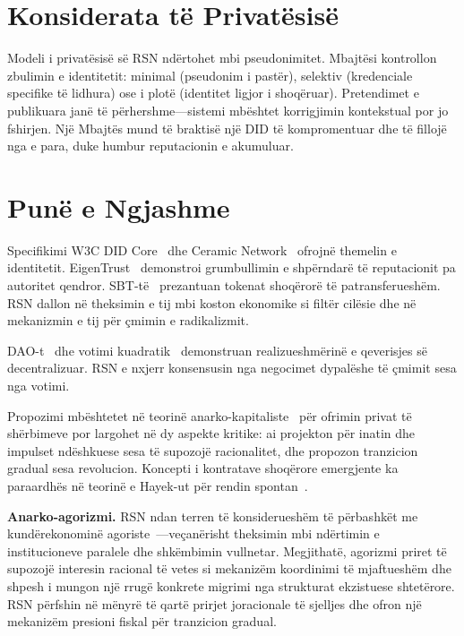 \documentclass[11pt,a4paper,twocolumn]{article}
\begin{document}
\section{Konsiderata të Privatësisë}

Modeli i privatësisë së RSN ndërtohet mbi pseudonimitet. Mbajtësi kontrollon zbulimin e identitetit: minimal (pseudonim i pastër), selektiv (kredenciale specifike të lidhura) ose i plotë (identitet ligjor i shoqëruar). Pretendimet e publikuara janë të përhershme---sistemi mbështet korrigjimin kontekstual por jo fshirjen. Një Mbajtës mund të braktisë një DID të kompromentuar dhe të fillojë nga e para, duke humbur reputacionin e akumuluar.

\section{Punë e Ngjashme}

Specifikimi W3C DID Core~\cite{did2022} dhe Ceramic Network~\cite{ceramic2023} ofrojnë themelin e identitetit. EigenTrust~\cite{kamvar2003} demonstroi grumbullimin e shpërndarë të reputacionit pa autoritet qendror. SBT-të~\cite{weyl2022} prezantuan tokenat shoqërorë të patransferueshëm. RSN dallon në theksimin e tij mbi koston ekonomike si filtër cilësie dhe në mekanizmin e tij për çmimin e radikalizmit.

DAO-t~\cite{buterin2014} dhe votimi kuadratik~\cite{buterin2019} demonstruan realizueshmërinë e qeverisjes së decentralizuar. RSN e nxjerr konsensusin nga negocimet dypalëshe të çmimit sesa nga votimi.

Propozimi mbështetet në teorinë anarko-kapitaliste~\cite{rothbard1973,hoppe2001} për ofrimin privat të shërbimeve por largohet në dy aspekte kritike: ai projekton për inatin dhe impulset ndëshkuese sesa të supozojë racionalitet, dhe propozon tranzicion gradual sesa revolucion. Koncepti i kontratave shoqërore emergjente ka paraardhës në teorinë e Hayek-ut për rendin spontan~\cite{hayek1973}.

\textbf{Anarko-agorizmi.} RSN ndan terren të konsiderueshëm të përbashkët me kundërekonominë agoriste~\cite{konkin2006}---veçanërisht theksimin mbi ndërtimin e institucioneve paralele dhe shkëmbimin vullnetar. Megjithatë, agorizmi priret të supozojë interesin racional të vetes si mekanizëm koordinimi të mjaftueshëm dhe shpesh i mungon një rrugë konkrete migrimi nga strukturat ekzistuese shtetërore. RSN përfshin në mënyrë të qartë prirjet joracionale të sjelljes dhe ofron një mekanizëm presioni fiskal për tranzicion gradual.
\end{document}
